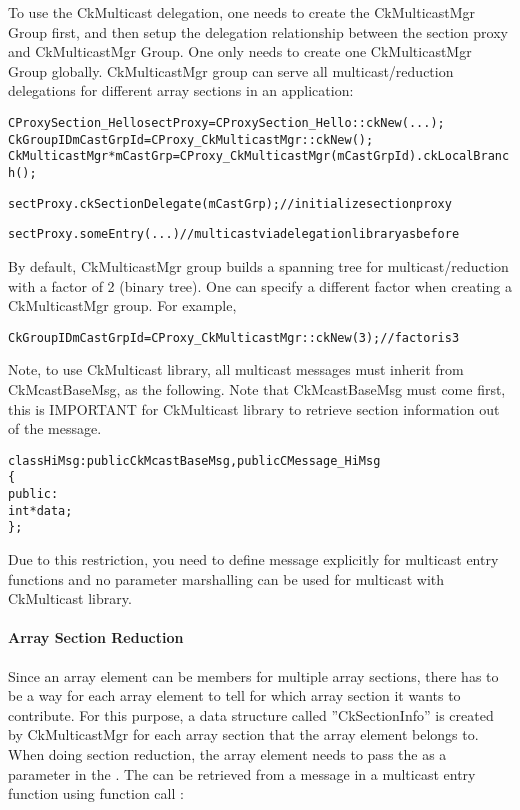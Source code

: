 To use the CkMulticast delegation, one needs to create the CkMulticastMgr Group 
first, and then setup the delegation relationship between the section proxy and 
CkMulticastMgr Group. 
One only needs to create one CkMulticastMgr Group globally.
CkMulticastMgr group can serve all multicast/reduction delegations
for different array sections in an application:

\begin{alltt}
  CProxySection_Hello sectProxy = CProxySection_Hello::ckNew(...);
  CkGroupID mCastGrpId = CProxy_CkMulticastMgr::ckNew();
  CkMulticastMgr *mCastGrp = CProxy_CkMulticastMgr(mCastGrpId).ckLocalBranch();

  sectProxy.ckSectionDelegate(mCastGrp);  // initialize section proxy

  sectProxy.someEntry(...)           //multicast via delegation library as before
\end{alltt}

By default, CkMulticastMgr group builds a spanning tree for multicast/reduction
with a factor of 2 (binary tree).
One can specify a different factor when creating a CkMulticastMgr group.
For example,

\begin{alltt}
  CkGroupID mCastGrpId = CProxy_CkMulticastMgr::ckNew(3);   // factor is 3
\end{alltt}

Note, to use CkMulticast library, all multicast messages must inherit from 
CkMcastBaseMsg, as the following.
Note that CkMcastBaseMsg must come first, this is IMPORTANT for CkMulticast 
library to retrieve section information out of the message.


\begin{alltt}
class HiMsg : public CkMcastBaseMsg, public CMessage_HiMsg
\{
public:
  int *data;
\};
\end{alltt}

Due to this restriction, you need to define message explicitly for multicast 
entry functions and no parameter marshalling can be used for multicast with 
CkMulticast library.

\paragraph{Array Section Reduction} 

Since an array element can be members for multiple array sections, 
there has to be a way for each array element to tell for which array
section it wants to contribute. For this purpose, a data structure 
called ''CkSectionInfo'' is created by CkMulticastMgr for each 
array section that the array element belongs to.
When doing section reduction, the array element needs to pass the 
 as a parameter in the . 
The  can be retrieved
from a message in a multicast entry function using function call 
:

